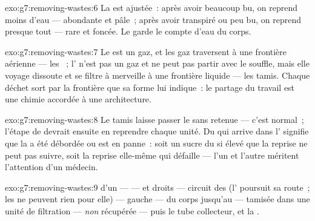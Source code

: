 \begin{solution}{exo:g7:removing-wastes:6}
La  est ajustée~: après avoir beaucoup bu, on reprend
moins d'eau ---  abondante et pâle~; après avoir transpiré ou
peu bu, on reprend presque tout ---  rare et foncée. Le 
garde le compte d'eau du corps.
\end{solution}

\begin{solution}{exo:g7:removing-wastes:7}
Le  est un gaz, et les gaz traversent à une
frontière aérienne --- les ~; l' n'est pas un gaz et ne
peut pas partir avec le souffle, mais elle voyage dissoute et se
filtre à merveille à une frontière liquide --- les tamis. Chaque
déchet sort par la frontière que sa forme lui indique~: le partage
du travail est une chimie accordée à une architecture.
\end{solution}

\begin{solution}{exo:g7:removing-wastes:8}
Le tamis laisse passer le  sans retenue --- c'est normal~;
l'étape de  devrait ensuite en reprendre chaque unité.
Du  qui arrive dans l' signifie que la  a
été débordée ou est en panne~: soit un sucre du  si élevé que la
reprise ne peut pas suivre, soit la reprise elle-même qui défaille
--- l'un et l'autre méritent l'attention d'un médecin.
\end{solution}

\begin{solution}{exo:g7:removing-wastes:9}
 d'un  ---  ---  et  droits
--- circuit des  (l' poursuit sa route~; les  ne
peuvent rien pour elle) ---  gauche ---  du corps jusqu'au
 --- tamisée dans une unité de filtration --- \emph{non}
récupérée --- puis le tube collecteur, et la .
\end{solution}


